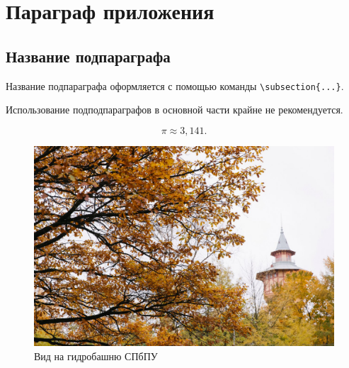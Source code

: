 \section{Параграф приложения}\label{app-2-1}							


\subsection{Название подпараграфа} \label{ch2:subsec-title-abbr} %


Название подпараграфа оформляется с помощью команды  \texttt{\textbackslash{}subsection\{...\}}.

Использование подподпараграфов в основной части крайне не рекомендуется.

\begin{equation}%
\label{eq:Pi-app2} %
\pi \approx 3,141.
\end{equation}
%
%
\begin{figure}[ht!] 
	\center
	\includegraphics [scale=0.27] {my_folder/images//spbpu_hydrotower}
	\caption{Вид на гидробашню СПбПУ \cite{spbpu-gallery}} 
	\label{fig:spbpu_hydrotower-app2}  
\end{figure}
%





